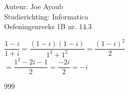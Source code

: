\documentclass[a4paper]{article}
\begin{document}
  
\noindent \large Auteur: Joe Ayoub \\
\noindent \large Studierichting: Informatica\\
\noindent \large Oefeningenreeks 1B nr. 14.3\\

\medskip

\normalsize

$\dfrac{1-i}{1+i} = \dfrac{(1-i)(1-i)}{1^2 + 1^2} = \dfrac{(1-i)^2}{2}$ \\

$= \dfrac{1^2 - 2i - 1}{2} = \dfrac{-2i}{2} = -i$

\begin{thebibliography}{999}
\end{thebibliography}
\end{document}
